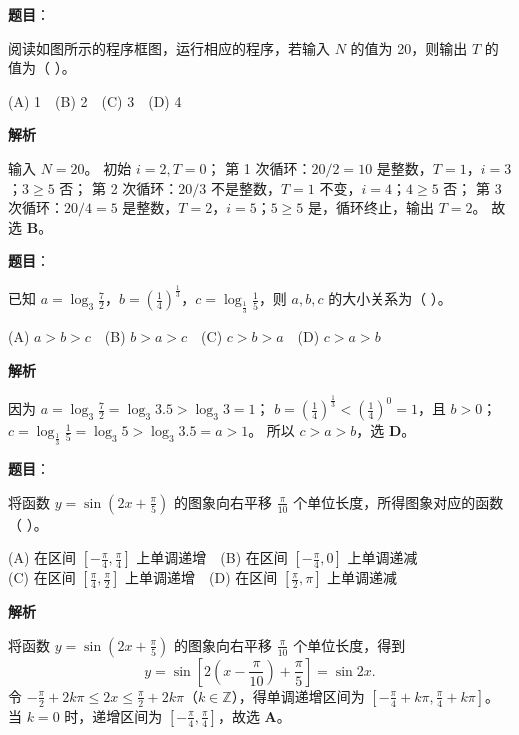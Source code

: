 \begin{answer}

\textbf{题目}：

阅读如图所示的程序框图，运行相应的程序，若输入 $N$ 的值为 20，则输出 $T$ 的值为（ ）。
\nopagebreak[4]
\begin{center}\end{center}
\nopagebreak[4]
(A) 1　(B) 2　(C) 3　(D) 4

\textbf{解析}

输入 $N=20$。
初始 $i=2,T=0$；
第 1 次循环：$20/2=10$ 是整数，$T=1$，$i=3$；$3\geqslant5$ 否；
第 2 次循环：$20/3$ 不是整数，$T=1$ 不变，$i=4$；$4\geqslant5$ 否；
第 3 次循环：$20/4=5$ 是整数，$T=2$，$i=5$；$5\geqslant5$ 是，循环终止，输出 $T=2$。
故选 \textbf{B}。


\end{answer}
\begin{answer}

\textbf{题目}：

已知 $a=\log_3\frac72$，$b=\left(\frac14\right)^{\frac13}$，$c=\log_{\frac13}\frac15$，则 $a,b,c$ 的大小关系为（ ）。

(A) $a>b>c$　(B) $b>a>c$　(C) $c>b>a$　(D) $c>a>b$

\textbf{解析}

因为 $a=\log_3\frac72=\log_3 3.5>\log_3 3=1$；
$b=\left(\frac14\right)^{\frac13}<\left(\frac14\right)^0=1$，且 $b>0$；
$c=\log_{\frac13}\frac15=\log_3 5>\log_3 3.5=a>1$。
所以 $c>a>b$，选 \textbf{D}。


\end{answer}
\begin{answer}

\textbf{题目}：

将函数 $y=\sin\left(2x+\frac\pi5\right)$ 的图象向右平移 $\frac\pi{10}$ 个单位长度，所得图象对应的函数（ ）。

(A) 在区间 $\left[-\frac\pi4,\frac\pi4\right]$ 上单调递增　(B) 在区间 $\left[-\frac\pi4,0\right]$ 上单调递减\\
(C) 在区间 $\left[\frac\pi4,\frac\pi2\right]$ 上单调递增　(D) 在区间 $\left[\frac\pi2,\pi\right]$ 上单调递减

\textbf{解析}

将函数 $y=\sin\left(2x+\frac\pi5\right)$ 的图象向右平移 $\frac\pi{10}$ 个单位长度，得到
\nopagebreak[4]
\[y=\sin\left[2\left(x-\frac\pi{10}\right)+\frac\pi5\right]=\sin 2x.\]
令 $-\frac\pi2+2k\pi\leqslant 2x\leqslant \frac\pi2+2k\pi$（$k\in\mathbb Z$），得单调递增区间为 $\left[-\frac\pi4+k\pi,\frac\pi4+k\pi\right]$。
当 $k=0$ 时，递增区间为 $\left[-\frac\pi4,\frac\pi4\right]$，故选 \textbf{A}。


\end{answer}
